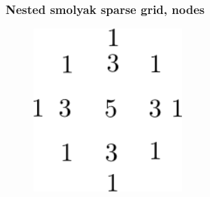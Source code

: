 \documentclass{beamer}
\begin{document}
\begin{frame}
 \frametitle{Nested smolyak sparse grid, nodes}
 \begin{figure}
  \includegraphics[width=0.5\textwidth]{smolyak_nested_nr.png}
 \end{figure}

\end{frame}
\end{document}

